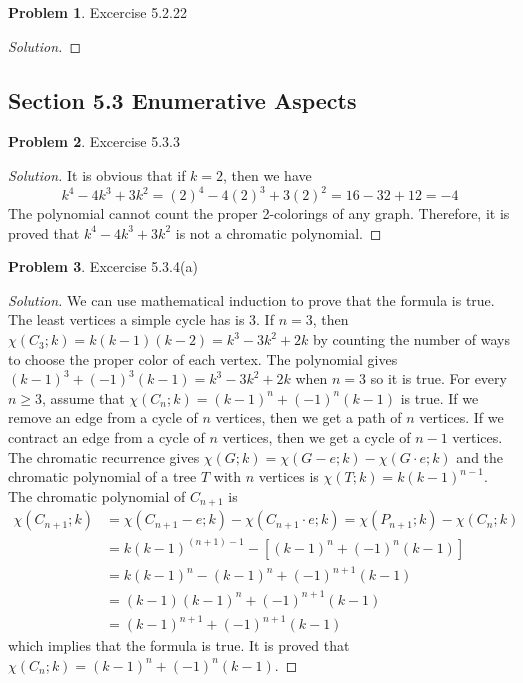 \documentclass[12pt]{article}
\theoremstyle{definition}
\newtheorem{problem}{Problem}
\newenvironment*{solution}{\begin{proof}[Solution]}{\end{proof}}
\begin{document}
\begin{problem}
    Excercise 5.2.22
\end{problem}
\begin{solution}
    
\end{solution}

\subsection*{Section 5.3 Enumerative Aspects}
\begin{problem}
    Excercise 5.3.3
\end{problem}
\begin{solution}
    It is obvious that if \(k=2\), then we have
    \[k^4-4k^3+3k^2 = (2)^4-4(2)^3+3(2)^2 = 16-32+12 = -4\]
    The polynomial cannot count the proper 2-colorings of any graph.
    Therefore, it is proved that \(k^4-4k^3+3k^2\) is not a chromatic
    polynomial.
\end{solution}

\begin{problem}
    Excercise 5.3.4(a)
\end{problem}
\begin{solution}
    We can use mathematical induction to prove that the formula is true.
    The least vertices a simple cycle has is 3.
    If \(n=3\), then \(\chi(C_3;k)=k(k-1)(k-2)=k^3-3k^2+2k\) by counting the
    number of ways to choose the proper color of each vertex.
    The polynomial gives \((k-1)^3+(-1)^3(k-1)=k^3-3k^2+2k\) when \(n=3\) so
    it is true.
    For every \(n\geq3\), assume that \(\chi(C_n;k) = (k-1)^n+(-1)^n(k-1)\) is
    true.
    If we remove an edge from a cycle of \(n\) vertices, then we get a path of
    \(n\) vertices.
    If we contract an edge from a cycle of \(n\) vertices, then we get a cycle
    of \(n-1\) vertices.
    The chromatic recurrence gives \(\chi(G;k)=\chi(G-e;k)-\chi(G\cdot e;k)\)
    and the chromatic polynomial of a tree \(T\) with \(n\) vertices is
    \(\chi(T;k)=k(k-1)^{n-1}\).
    The chromatic polynomial of \(C_{n+1}\) is
    \begin{align*}
        \chi(C_{n+1};k) &= \chi(C_{n+1}-e;k) - \chi(C_{n+1}\cdot e;k)
        = \chi(P_{n+1};k) - \chi(C_{n};k) \\
        &= k(k-1)^{(n+1)-1} - [(k-1)^n+(-1)^n(k-1)] \\
        &= k(k-1)^n - (k-1)^n + (-1)^{n+1}(k-1) \\
        &= (k-1)(k-1)^n + (-1)^{n+1}(k-1) \\
        &= (k-1)^{n+1} + (-1)^{n+1}(k-1)
    \end{align*}
    which implies that the formula is true.
    It is proved that \(\chi(C_n;k) = (k-1)^n+(-1)^n(k-1)\).
\end{solution}
\end{document}
